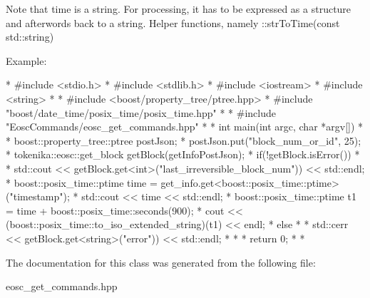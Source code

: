 Note that time is a string. For processing, it has to be expressed as a structure and afterwords back to a string. Helper functions, namely \+::str\+To\+Time(const std\+::string)

Example\+:

\begin{DoxyVerb}* #include <stdio.h>
* #include <stdlib.h>
* #include <iostream>
* #include <string>
* 
* #include <boost/property_tree/ptree.hpp>
* #include "boost/date_time/posix_time/posix_time.hpp"
* 
* #include "EoscCommands/eosc_get_commands.hpp"  
* 
* int main(int argc, char *argv[])
* {
* boost::property_tree::ptree postJson;
* postJson.put("block_num_or_id", 25);
* tokenika::eosc::get_block getBlock(getInfoPostJson);
* if(!getBlock.isError())
* {
*    std::cout << getBlock.get<int>("last_irreversible_block_num")) << std::endl;
*    boost::posix_time::ptime time = get_info.get<boost::posix_time::ptime>("timestamp");
*    std::cout << time << std::endl;
*    boost::posix_time::ptime t1 = time + boost::posix_time::seconds(900);
*    cout << (boost::posix_time::to_iso_extended_string)(t1) << endl;
* } else
* {
*    std::cerr << getBlock.get<string>("error")) << std::endl;
* }
* 
* return 0;
* }
* \end{DoxyVerb}
 

The documentation for this class was generated from the following file\+:\begin{DoxyCompactItemize}
\item 
eosc\+\_\+get\+\_\+commands.\+hpp\end{DoxyCompactItemize}

